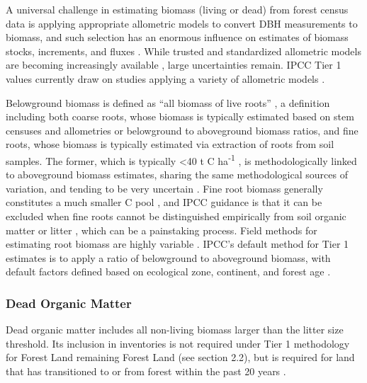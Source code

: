 \documentclass[, manuscript]{copernicus}
\begin{document}
A universal challenge in estimating biomass (living or dead) from forest
census data is applying appropriate allometric models to convert DBH
measurements to biomass, and such selection has an enormous influence on
estimates of biomass stocks, increments, and fluxes
\citep{clark_landscapescale_2000, clark_net_2001, calders_laser_2022}.
While trusted and standardized allometric models are becoming
increasingly available
\citep{chave_improved_2014, rejou-mechain_biomass_2017, gonzalez-akre_allodb_2022},
large uncertainties remain. IPCC Tier 1 values currently draw on studies
applying a variety of allometric models
\citep[e.g.,][]{requenasuarez_estimating_2019, rozendaal_aboveground_2022}.

Belowground biomass is defined as ``all biomass of live roots''
\citep{ipcc_good_2003, ipcc_2006_2006}, a definition including both
coarse roots, whose biomass is typically estimated based on stem
censuses and allometries or belowground to aboveground biomass ratios,
and fine roots, whose biomass is typically estimated via extraction of
roots from soil samples. The former, which is typically \textless40 t C
ha\textsuperscript{-1} \citep{anderson-teixeira_carbon_2021}, is
methodologically linked to aboveground biomass estimates, sharing the
same methodological sources of variation, and tending to be very
uncertain \citep[e.g.,][]{keller_biomass_2001}. Fine root biomass
generally constitutes a much smaller C pool \citep[typically \textless5
t C ha\textsuperscript{-1},][]{anderson-teixeira_carbon_2021}, and IPCC
guidance is that it can be excluded when fine roots cannot be
distinguished empirically from soil organic matter or litter
\citep{ipcc_2006_2006}, which can be a painstaking process. Field
methods for estimating root biomass are highly variable
\citep{freschet_starting_2021}. IPCC's default method for Tier 1
estimates is to apply a ratio of belowground to aboveground biomass,
with default factors defined based on ecological zone, continent, and
forest age \citep{ipcc_2006_2006, ipcc_2019_2019}.

\subsubsection{Dead Organic Matter}

Dead organic matter includes all non-living biomass larger than the
litter size threshold. Its inclusion in inventories is not required
under Tier 1 methodology for Forest Land remaining Forest Land (see
section 2.2), but is required for land that has transitioned to or from
forest within the past 20 years \citep{ipcc_2006_2006}.
\end{document}
